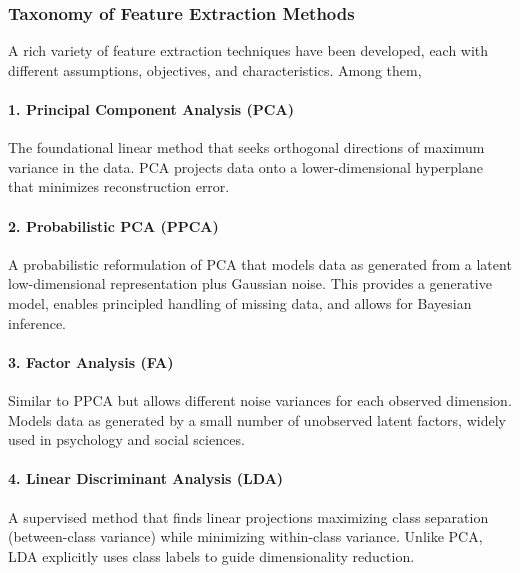 \subsubsection*{Taxonomy of Feature Extraction Methods}

A rich variety of feature extraction techniques have been developed, each with different assumptions, objectives, and characteristics. Among them,

\paragraph{1. Principal Component Analysis (PCA)}
The foundational linear method that seeks orthogonal directions of maximum variance in the data. PCA projects data onto a lower-dimensional hyperplane that minimizes reconstruction error.

\paragraph{2. Probabilistic PCA (PPCA)}
A probabilistic reformulation of PCA that models data as generated from a latent low-dimensional representation plus Gaussian noise. This provides a generative model, enables principled handling of missing data, and allows for Bayesian inference.


\paragraph{3. Factor Analysis (FA)}
Similar to PPCA but allows different noise variances for each observed dimension. Models data as generated by a small number of unobserved latent factors, widely used in psychology and social sciences.

\paragraph{4. Linear Discriminant Analysis (LDA)}
A supervised method that finds linear projections maximizing class separation (between-class variance) while minimizing within-class variance. Unlike PCA, LDA explicitly uses class labels to guide dimensionality reduction.

